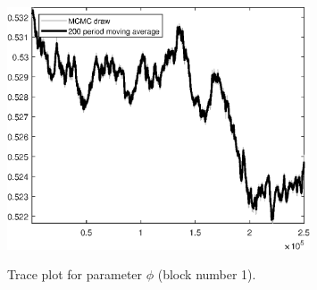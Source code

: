 \begin{figure}[H]
\centering
  \includegraphics[width=0.8\textwidth]{BRS_imp_mobility/graphs/TracePlot_phi_blck_1}\\
    \caption{Trace plot for parameter ${\phi}$ (block number 1).}
\end{figure}
